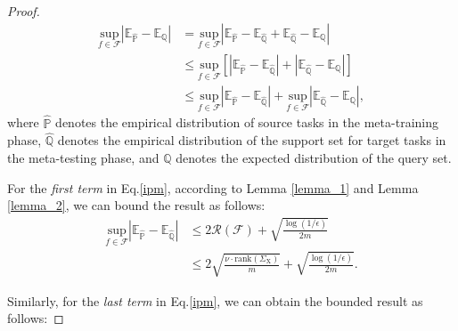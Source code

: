 \begin{proof}
\begin{equation}
\label{ipm}
    \begin{aligned}
        \underset{f\in\mathcal{F}}{\text{sup}} |\mathbb{E}_{\hat{\mathbb P} }-\mathbb E_{\mathbb Q}| &= \underset{f\in\mathcal{F}}{\text{sup}}|\mathbb{E}_{\hat{\mathbb P} } - \mathbb E_{\hat{\mathbb Q}} + \mathbb E_{\hat{\mathbb Q}} - \mathbb E_{\mathbb Q}| \\
        &\leq \underset{f\in\mathcal{F}}{\text{sup}} \left[ \left|\mathbb{E}_{\hat{\mathbb P} } - \mathbb E_{\hat{\mathbb Q}} \right| + \left| \mathbb E_{\hat{\mathbb Q}} - \mathbb E_{\mathbb Q} \right| \right] \\
        &\leq  \underset{f\in\mathcal{F}}{\text{sup}}\left| \mathbb{E}_{\hat{\mathbb P} } - \mathbb E_{\hat{\mathbb Q}} \right| + \underset{f\in\mathcal{F}}{\text{sup}} \left| \mathbb E_{\hat{\mathbb Q}} - \mathbb E_{\mathbb Q} \right|,
    \end{aligned}
\end{equation}
where $\mathbb{\hat{P}}$ denotes the empirical distribution of source tasks in the meta-training phase, $\mathbb{\hat{Q}}$ denotes the empirical distribution of the support set for target tasks in the meta-testing phase, and $\mathbb Q$ denotes the expected distribution of the query set.

For the \textit{first term} in Eq.\ref{ipm}, according to Lemma \ref{lemma_1} and Lemma \ref{lemma_2}, we can bound the result as follows:
\begin{equation}
\label{imp_first}
\begin{aligned}
    \underset{f\in\mathcal{F}}{\text{sup}}\left| \mathbb{E}_{\hat{\mathbb P} } - \mathbb E_{\hat{\mathbb Q}} \right| &\leq 2 \mathcal{R}(\mathcal{F})+\sqrt{\frac{\log(1/\epsilon)}{2m}} \\
    &\leq 2\sqrt{\frac{\nu\cdot\textrm{rank}(\Sigma_\mathrm{X})}{m}}+\sqrt{\frac{\log(1/\epsilon)}{2m}}.
\end{aligned}
\end{equation}

Similarly, for the \textit{last term} in Eq.\ref{ipm}, we can obtain the bounded result as follows:


\end{proof}
